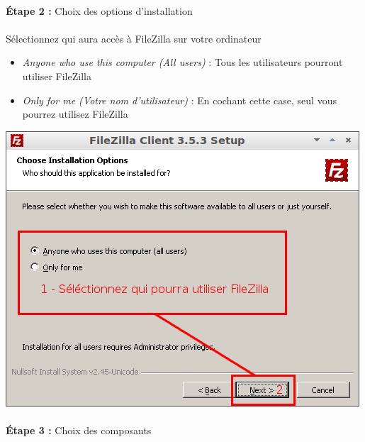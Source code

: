 \documentclass[10pt,a4paper]{article}
\begin{document}
\paragraph{}\textbf{Étape 2 : }Choix des options d'installation
\paragraph{}Sélectionnez qui aura accès à FileZilla sur votre ordinateur
\begin{itemize}
\item \textit{Anyone who use this computer (All users)} : Tous les utilisateurs pourront utiliser FileZilla
\item \textit{Only for me (Votre nom d'utilisateur)} : En cochant cette case, seul vous pourrez utilisez FileZilla
\end{itemize}
\begin{center}
\includegraphics[scale=0.5]{img/0017.png}
\end{center}
\paragraph{}\textbf{Étape 3 : }Choix des composants
\end{document}

